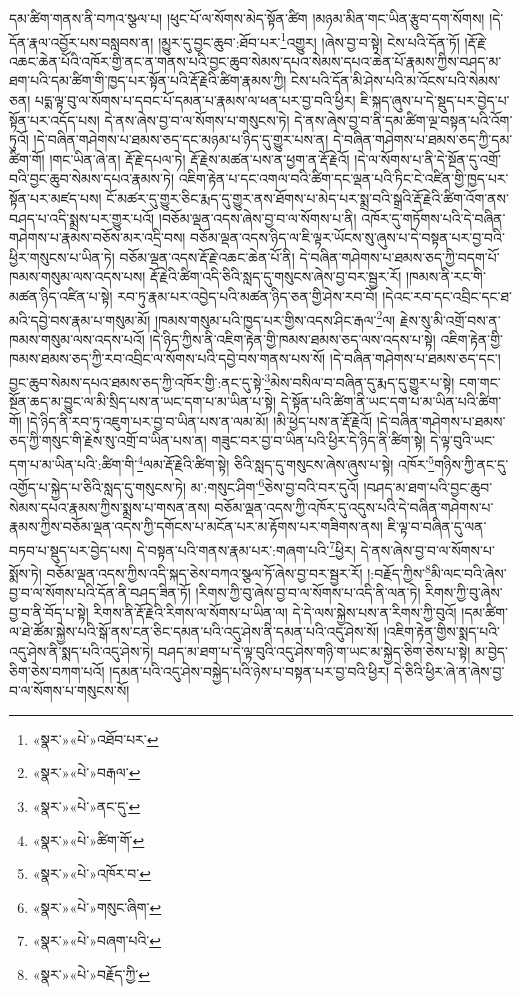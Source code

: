 དམ་ཚིག་གནས་ནི་བཀའ་སྩལ་པ། །ཕུང་པོ་ལ་སོགས་མེད་སྟོན་ཚིག །མཉམ་མིན་གང་ཡིན་རྩུབ་དག་སོགས། །དེ་དོན་རྣལ་འབྱོར་པས་བསླབས་ན། །མྱུར་དུ་བྱང་ཆུབ་:ཐོབ་པར་\footnote{«སྣར་»«པེ་»འཐོབ་པར་}འགྱུར། །ཞེས་བྱ་བ་སྟེ། ངེས་པའི་དོན་ཏོ། །རྡོ་རྗེ་འཆང་ཆེན་པོའི་འཁོར་གྱི་ནང་ན་གནས་པའི་བྱང་ཆུབ་སེམས་དཔའ་སེམས་དཔའ་ཆེན་པོ་རྣམས་ཀྱིས་བཤད་མ་ཐག་པའི་དམ་ཚིག་གི་ཁྱད་པར་སྟོན་པའི་རྡོ་རྗེའི་ཚིག་རྣམས་ཀྱི། ངེས་པའི་དོན་མི་ཤེས་པའི་མ་འོངས་པའི་སེམས་ཅན། པདྨ་ལྟ་བུ་ལ་སོགས་པ་དབང་པོ་དམན་པ་རྣམས་ལ་ཕན་པར་བྱ་བའི་ཕྱིར། ཇི་སྐད་ཞུས་པ་དེ་སྡུད་པར་བྱེད་པ་སྟོན་པར་འདོད་པས། དེ་ནས་ཞེས་བྱ་བ་ལ་སོགས་པ་གསུངས་ཏེ། དེ་ནས་ཞེས་བྱ་བ་ནི་དམ་ཚིག་ལྔ་བསྟན་པའི་འོག་ཏུའོ། །དེ་བཞིན་གཤེགས་པ་ཐམས་ཅད་དང་མཉམ་པ་ཉིད་དུ་གྱུར་པས་ན། དེ་བཞིན་གཤེགས་པ་ཐམས་ཅད་ཀྱི་དམ་ཚིག་གོ། །གང་ཡིན་ཞེ་ན། རྡོ་རྗེ་དཔལ་ཏེ། རྡོ་རྗེས་མཚན་པས་ན་ཕྱག་ན་རྡོ་རྗེའོ། །དེ་ལ་སོགས་པ་ནི་དེ་སྔོན་དུ་འགྲོ་བའི་བྱང་ཆུབ་སེམས་དཔའ་རྣམས་ཏེ། འཇིག་རྟེན་པ་དང་འགལ་བའི་ཚིག་དང་ལྡན་པའི་ཏིང་ངེ་འཛིན་གྱི་ཁྱད་པར་སྟོན་པར་མཛད་པས། ངོ་མཚར་དུ་གྱུར་ཅིང་རྨད་དུ་གྱུར་ནས་ཐོགས་པ་མེད་པར་སྨྲ་བའི་སྒྲའི་རྡོ་རྗེའི་ཚིག་འོག་ནས་བཤད་པ་འདི་སྨྲས་པར་གྱུར་པའོ། །བཅོམ་ལྡན་འདས་ཞེས་བྱ་བ་ལ་སོགས་པ་ནི། འཁོར་དུ་གཏོགས་པའི་དེ་བཞིན་གཤེགས་པ་རྣམས་བཅོས་མར་འདྲི་བས། བཅོམ་ལྡན་འདས་ཉིད་ལ་ཇི་ལྟར་ཡོངས་སུ་ཞུས་པ་དེ་བསྟན་པར་བྱ་བའི་ཕྱིར་གསུངས་པ་ཡིན་ཏེ། བཅོམ་ལྡན་འདས་རྡོ་རྗེ་འཆང་ཆེན་པོ་ནི། དེ་བཞིན་གཤེགས་པ་ཐམས་ཅད་ཀྱི་བདག་པོ་ཁམས་གསུམ་ལས་འདས་པས། རྡོ་རྗེའི་ཚིག་འདི་ཅིའི་སླད་དུ་གསུངས་ཞེས་བྱ་བར་སྦྱར་རོ། །ཁམས་ནི་རང་གི་མཚན་ཉིད་འཛིན་པ་སྟེ། རབ་ཏུ་རྣམ་པར་འབྱེད་པའི་མཚན་ཉིད་ཅན་གྱི་ཤེས་རབ་བོ། །དེའང་རབ་དང་འབྲིང་དང་ཐ་མའི་དབྱེ་བས་རྣམ་པ་གསུམ་མོ། །ཁམས་གསུམ་པའི་ཁྱད་པར་གྱིས་འདས་ཤིང་རྒལ་\footnote{«སྣར་»«པེ་»བརྒལ་}ལ། རྗེས་སུ་མི་འགྲོ་བས་ན་ཁམས་གསུམ་ལས་འདས་པའོ། །དེ་ཉིད་ཀྱིས་ནི་འཇིག་རྟེན་གྱི་ཁམས་ཐམས་ཅད་ལས་འདས་པ་སྟེ། འཇིག་རྟེན་གྱི་ཁམས་ཐམས་ཅད་ཀྱི་རབ་འབྲིང་ལ་སོགས་པའི་དབྱེ་བས་གནས་པས་སོ། །དེ་བཞིན་གཤེགས་པ་ཐམས་ཅད་དང་། བྱང་ཆུབ་སེམས་དཔའ་ཐམས་ཅད་ཀྱི་འཁོར་གྱི་:ནང་དུ་སྟེ་\footnote{«སྣར་»«པེ་»ནང་དུ་}མེས་བསིལ་བ་བཞིན་དུ་རྨད་དུ་གྱུར་པ་སྟེ། ངག་གང་སྔོན་ཆད་མ་བྱུང་ལ་མི་སྲིད་པས་ན་ཡང་དག་པ་མ་ཡིན་པ་སྟེ། དེ་སྟོན་པའི་ཚིག་ནི་ཡང་དག་པ་མ་ཡིན་པའི་ཚིག་གོ། །དེ་ཉིད་ནི་རབ་ཏུ་འཇུག་པར་བྱ་བ་ཡིན་པས་ན་ལམ་མོ། །མི་ཕྱེད་པས་ན་རྡོ་རྗེའོ། །དེ་བཞིན་གཤེགས་པ་ཐམས་ཅད་ཀྱི་གསུང་གི་རྗེས་སུ་འགྲོ་བ་ཡིན་པས་ན། གཟུང་བར་བྱ་བ་ཡིན་པའི་ཕྱིར་དེ་ཉིད་ནི་ཚིག་སྟེ། དེ་ལྟ་བུའི་ཡང་དག་པ་མ་ཡིན་པའི་:ཚིག་གི་\footnote{«སྣར་»«པེ་»ཚིག་གོ་}ལམ་རྡོ་རྗེའི་ཚིག་སྟེ། ཅིའི་སླད་དུ་གསུངས་ཞེས་ཞུས་པ་སྟེ། འཁོར་\footnote{«སྣར་»«པེ་»འཁོར་བ་}གཉིས་ཀྱི་ནང་དུ་འགྱོད་པ་སྐྱེད་པ་ཅིའི་སླད་དུ་གསུངས་ཏེ། མ་:གསུང་ཤིག་\footnote{«སྣར་»«པེ་»གསུང་ཞིག་}ཅེས་བྱ་བའི་བར་དུའོ། །བཤད་མ་ཐག་པའི་བྱང་ཆུབ་སེམས་དཔའ་རྣམས་ཀྱིས་སྨྲས་པ་གསན་ནས། བཅོམ་ལྡན་འདས་ཀྱི་འཁོར་དུ་འདུས་པའི་དེ་བཞིན་གཤེགས་པ་རྣམས་ཀྱིས་བཅོམ་ལྡན་འདས་ཀྱི་དགོངས་པ་མངོན་པར་མ་རྟོགས་པར་གཟིགས་ནས། ཇི་ལྟ་བ་བཞིན་དུ་ལན་བཏབ་པ་སྡུད་པར་བྱེད་པས། དེ་བསྟན་པའི་གནས་རྣམ་པར་:གཞག་པའི་\footnote{«སྣར་»«པེ་»བཞག་པའི་}ཕྱིར། དེ་ནས་ཞེས་བྱ་བ་ལ་སོགས་པ་སྨོས་ཏེ། བཅོམ་ལྡན་འདས་ཀྱིས་འདི་སྐད་ཅེས་བཀའ་སྩལ་ཏོ་ཞེས་བྱ་བར་སྦྱར་རོ། །:བརྗོད་ཀྱིས་\footnote{«སྣར་»«པེ་»བརྗོད་ཀྱི་}མི་ལང་བའི་ཞེས་བྱ་བ་ལ་སོགས་པའི་དོན་ནི་བཤད་ཟིན་ཏོ། །རིགས་ཀྱི་བུ་ཞེས་བྱ་བ་ལ་སོགས་པ་འདི་ནི་ལན་ཏེ། རིགས་ཀྱི་བུ་ཞེས་བྱ་བ་ནི་བོད་པ་སྟེ། རིགས་ནི་རྡོ་རྗེའི་རིགས་ལ་སོགས་པ་ཡིན་ལ། དེ་དེ་ལས་སྐྱེས་པས་ན་རིགས་ཀྱི་བུའོ། །དམ་ཚིག་ལ་ཐེ་ཚོམ་སྐྱེས་པའི་སྒོ་ནས་ངན་ཅིང་དམན་པའི་འདུ་ཤེས་ནི་དམན་པའི་འདུ་ཤེས་སོ། །འཇིག་རྟེན་གྱིས་སྨད་པའི་འདུ་ཤེས་ནི་སྨད་པའི་འདུ་ཤེས་ཏེ། བཤད་མ་ཐག་པ་དེ་ལྟ་བུའི་འདུ་ཤེས་གཉི་ག་ཡང་མ་སྐྱེད་ཅིག་ཅེས་པ་སྟེ། མ་བྱེད་ཅིག་ཅེས་བཀག་པའོ། །དམན་པའི་འདུ་ཤེས་བསྐྱེད་པའི་ཉེས་པ་བསྟན་པར་བྱ་བའི་ཕྱིར། དེ་ཅིའི་ཕྱིར་ཞེ་ན་ཞེས་བྱ་བ་ལ་སོགས་པ་གསུངས་སོ། 